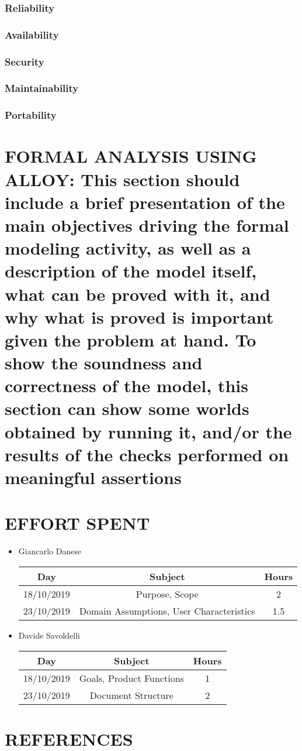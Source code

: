 \documentclass[12pt,a4paper]{article}
\begin{document}
\subsubsection{Reliability}
\subsubsection{Availability}
\subsubsection{Security}
\subsubsection{Maintainability}
\subsubsection{Portability}
\section{FORMAL ANALYSIS USING ALLOY: This section should include a brief presentation of the 
main objectives driving the formal modeling activity, as well as a description of the model 
itself, what can be proved with it, and why what is proved is important given the problem at 
hand. To show  the soundness and correctness of the model,  this section can show some
worlds obtained by running it, and/or the results of the checks performed on meaningful 
assertions}
\section{EFFORT SPENT}
\begin{itemize}
		\item Giancarlo Danese
		\begin{center}
			\begin{tabular}{| c | c | c |}
				\hline
				Day & Subject & Hours \\ \hline
				18/10/2019 & Purpose, Scope & 2 \\
				23/10/2019 & Domain Assumptions, User Characteristics & 1.5 \\
				\hline
			\end{tabular}
		\end{center}

		\item Davide Savoldelli
		\begin{center}
			\begin{tabular}{| c | c | c |}
				\hline
				Day & Subject & Hours \\ \hline
				18/10/2019 & Goals, Product Functions & 1 \\
				23/10/2019 & Document Structure & 2 \\
				\hline
			\end{tabular}
		\end{center}
	\end{itemize}
\section{REFERENCES}
\end{document}
